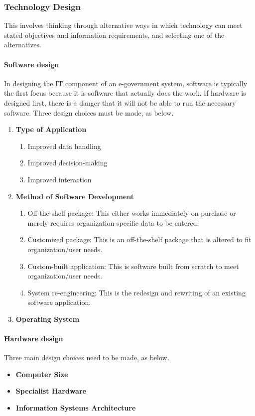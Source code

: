 \subsubsection{Technology Design}
This involves thinking through alternative
ways in which technology can meet stated
objectives and information requirements,
and selecting one of the alternatives. 

\paragraph*{Software design}
In designing the IT component of an
e-government system, software is typically
the first focus because it is software that actually does the work. If hardware is designed
first, there is a danger that it will not be able
to run the necessary software. Three design
choices must be made, as below.

\begin{enumerate}
	\item \textbf{Type of Application}
		\begin{enumerate}
			\item Improved data handling
			\item Improved decision-making
			\item Improved interaction
		\end{enumerate}
	\item \textbf{Method of Software Development}
	\begin{enumerate}
		\item Off-the-shelf package: This either works
		immediately on purchase or merely requires
		organization-specific data to be entered.
		
		\item Customized package: This is an off-the-shelf
		package that is altered to fit organization/user needs.
		
		\item Custom-built application: This is software
		built from scratch to meet organization/user needs.
		
		\item System re-engineering: This is the redesign
		and rewriting of an existing software application.
	\end{enumerate}
\item \textbf{Operating System}
\end{enumerate}

\paragraph*{Hardware design}
Three main design choices need to be made,
as below.
\begin{itemize}
	\item \textbf{Computer Size}
	\item \textbf{Specialist Hardware}
	\item \textbf{Information Systems Architecture}
\end{itemize}


